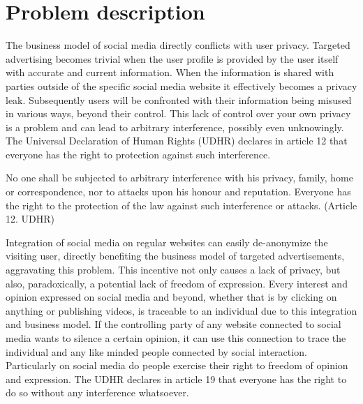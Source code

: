 \section{Problem description}




The business model of social media directly conflicts with user privacy.
Targeted advertising becomes trivial when the user profile is provided by the user itself with accurate and current information.
When the information is shared with parties outside of the specific social media website it effectively becomes a privacy leak.
Subsequently users will be confronted with their information being misused in various ways, beyond their control.
This lack of control over your own privacy is a problem and can lead to arbitrary interference, possibly even unknowingly. %
The Universal Declaration of Human Rights (UDHR) declares in article 12 that everyone has the right to protection against such interference.

\begin{displayquote}
	No one shall be subjected to arbitrary interference with his privacy, family, home or correspondence, nor to attacks upon his honour and reputation. Everyone has the right to the protection of the law against such interference or attacks.
	(Article 12. UDHR)
\end{displayquote}

Integration of social media on regular websites can easily de-anonymize the visiting user, directly benefiting the business model of targeted advertisements, aggravating this problem.
This incentive not only causes a lack of privacy, but also, paradoxically, a potential lack of freedom of expression.
Every interest and opinion expressed on social media and beyond, whether that is by clicking on anything or publishing videos, is traceable to an individual due to this integration and business model.
If the controlling party of any website connected to social media wants to silence a certain opinion, it can use this connection to trace the individual and any like minded people connected by social interaction.
Particularly on social media do people exercise their right to freedom of opinion and expression.
The UDHR declares in article 19 that everyone has the right to do so without any interference whatsoever.


